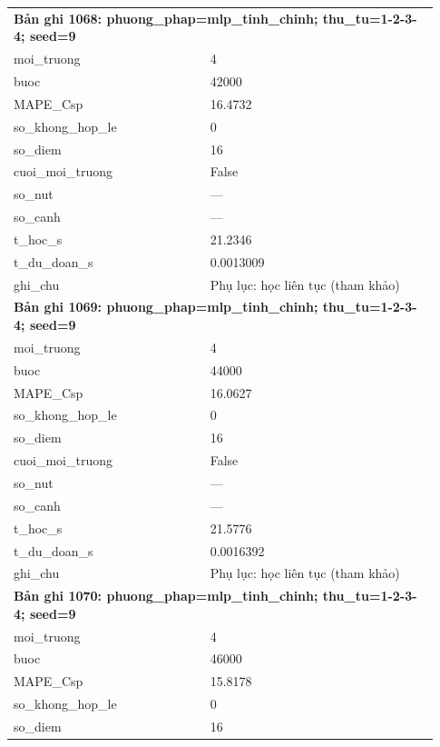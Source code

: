 \begin{longtable}{p{0.43\linewidth}p{0.50\linewidth}}
\midrule
\multicolumn{2}{p{0.95\linewidth}}{\textbf{Bản ghi 1068: phuong\_phap=mlp\_tinh\_chinh; thu\_tu=1-2-3-4; seed=9}} \\
moi\_\allowbreak truong & 4 \\
buoc & 42000 \\
MAPE\_\allowbreak Csp & 16.4732 \\
so\_\allowbreak khong\_\allowbreak hop\_\allowbreak le & 0 \\
so\_\allowbreak diem & 16 \\
cuoi\_\allowbreak moi\_\allowbreak truong & False \\
so\_\allowbreak nut & — \\
so\_\allowbreak canh & — \\
t\_\allowbreak hoc\_\allowbreak s & 21.2346 \\
t\_\allowbreak du\_\allowbreak doan\_\allowbreak s & 0.0013009 \\
ghi\_\allowbreak chu & Phụ lục: học liên tục (tham khảo) \\
\midrule
\multicolumn{2}{p{0.95\linewidth}}{\textbf{Bản ghi 1069: phuong\_phap=mlp\_tinh\_chinh; thu\_tu=1-2-3-4; seed=9}} \\
moi\_\allowbreak truong & 4 \\
buoc & 44000 \\
MAPE\_\allowbreak Csp & 16.0627 \\
so\_\allowbreak khong\_\allowbreak hop\_\allowbreak le & 0 \\
so\_\allowbreak diem & 16 \\
cuoi\_\allowbreak moi\_\allowbreak truong & False \\
so\_\allowbreak nut & — \\
so\_\allowbreak canh & — \\
t\_\allowbreak hoc\_\allowbreak s & 21.5776 \\
t\_\allowbreak du\_\allowbreak doan\_\allowbreak s & 0.0016392 \\
ghi\_\allowbreak chu & Phụ lục: học liên tục (tham khảo) \\
\midrule
\multicolumn{2}{p{0.95\linewidth}}{\textbf{Bản ghi 1070: phuong\_phap=mlp\_tinh\_chinh; thu\_tu=1-2-3-4; seed=9}} \\
moi\_\allowbreak truong & 4 \\
buoc & 46000 \\
MAPE\_\allowbreak Csp & 15.8178 \\
so\_\allowbreak khong\_\allowbreak hop\_\allowbreak le & 0 \\
so\_\allowbreak diem & 16 \\

\end{longtable}
